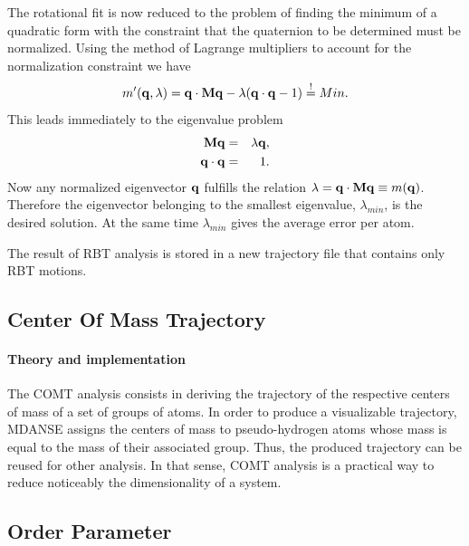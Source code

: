 \documentclass[a4paper,11pt]{article}
\begin{document}
The rotational fit is now reduced to the problem of finding the minimum of a quadratic form with the constraint that the 
quaternion to be determined must be normalized. Using the method of Lagrange multipliers to account for the normalization 
constraint we have 
\begin{equation}
m'({\bf q},\lambda) = {\bf q}\cdot{\bf M}{\bf q}
- \lambda({\bf q}\cdot{\bf q} - 1) \stackrel{!}{=} Min.
\end{equation}
This leads immediately to the eigenvalue problem
\begin{eqnarray}
{\bf M}{\bf q} &= &\lambda{\bf q},\\
{\bf q}\cdot{\bf q} &= &1.
\end{eqnarray}
Now any normalized eigenvector ${\bf q}$ fulfills the relation $\lambda = {\bf q}\cdot{\bf M}{\bf q} \equiv m({\bf q})$. 
Therefore the eigenvector belonging to the smallest eigenvalue, $\lambda_{min}$, is the desired solution. At the same 
time $\lambda_{min}$ gives the average error per atom.

The result of \gls{RBT} analysis is stored in a new trajectory file that contains only \gls{RBT} motions.


\subsection{Center Of Mass Trajectory}
\label{comt}
\paragraph{Theory and implementation\\}
\label{comt_theory}
The \gls{COMT} analysis consists in deriving the trajectory of the respective centers of mass of a 
set of groups of atoms. In order to produce a visualizable trajectory, \gls{MDANSE} assigns the centers of mass to 
pseudo-hydrogen atoms whose mass is equal to the mass of their associated group. Thus, the produced trajectory can be reused 
for other analysis. In that sense, \gls{COMT} analysis is a practical way to reduce noticeably the dimensionality of a system.

\subsection{Order Parameter}
\label{op}
\end{document}
